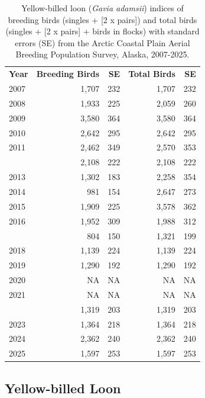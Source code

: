 \documentclass[
]{article}
\begin{document}
\begin{longtable}[t]{lrrrr}

\caption{\label{tbl-YBLO}Yellow-billed loon (\emph{Gavia adamsii})
indices of breeding birds (singles + {[}2 x pairs{]}) and total birds
(singles + {[}2 x pairs{]} + birds in flocks) with standard errors (SE)
from the Arctic Coastal Plain Aerial Breeding Population Survey, Alaska,
2007-2025.}

\tabularnewline

\\
\toprule
\textbf{Year} & \textbf{Breeding Birds} & \textbf{SE} & \textbf{Total Birds} & \textbf{SE}\\
\midrule
2007 & 1,707 & 232 & 1,707 & 232\\
2008 & 1,933 & 225 & 2,059 & 260\\
2009 & 3,580 & 364 & 3,580 & 364\\
2010 & 2,642 & 295 & 2,642 & 295\\
2011 & 2,462 & 349 & 2,570 & 353\\
\addlinespace
2012 & 2,108 & 222 & 2,108 & 222\\
2013 & 1,302 & 183 & 2,258 & 354\\
2014 & 981 & 154 & 2,647 & 273\\
2015 & 1,909 & 225 & 3,578 & 362\\
2016 & 1,952 & 309 & 1,988 & 312\\
\addlinespace
2017 & 804 & 150 & 1,321 & 199\\
2018 & 1,139 & 224 & 1,139 & 224\\
2019 & 1,290 & 192 & 1,290 & 192\\
2020 & NA & NA & NA & NA\\
2021 & NA & NA & NA & NA\\
\addlinespace
2022 & 1,319 & 203 & 1,319 & 203\\
2023 & 1,364 & 218 & 1,364 & 218\\
2024 & 2,362 & 240 & 2,362 & 240\\
2025 & 1,597 & 253 & 1,597 & 253\\
\bottomrule

\end{longtable}

\endgroup{}

\newpage{}

\subsection*{Yellow-billed Loon}\label{yellow-billed-loon-2}
\end{document}
